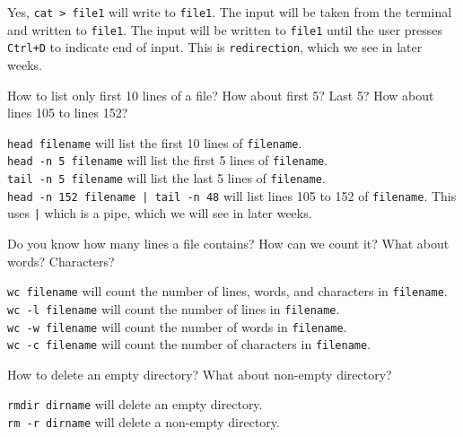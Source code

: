 \begin{ans}
  Yes, \texttt{cat > file1} will write to \texttt{file1}. The input will be taken from the
  terminal and written to \texttt{file1}. The input will be written to \texttt{file1} until
  the user presses \texttt{Ctrl+D} to indicate end of input.
  This is \texttt{redirection}, which we see in later weeks.
\end{ans}

\begin{qs}
  How to list only first 10 lines of a file? How about first 5? Last 5?
  How about lines 105 to lines 152?
\end{qs}

\begin{ans}
  \texttt{head filename} will list the first 10 lines of \texttt{filename}. \\
  \texttt{head -n 5 filename} will list the first 5 lines of \texttt{filename}. \\
  \texttt{tail -n 5 filename} will list the last 5 lines of \texttt{filename}. \\
  \texttt{head -n 152 filename | tail -n 48} will list lines 105 to 152 of \texttt{filename}.
  This uses \texttt{|} which is a pipe, which we will see in later weeks.
\end{ans}

\begin{qs}
  Do you know how many lines a file contains? How can we count it?
  What about words? Characters?
\end{qs}

\begin{ans}
  \texttt{wc filename} will count the number of lines, words, and characters in \texttt{filename}. \\
  \texttt{wc -l filename} will count the number of lines in \texttt{filename}. \\
  \texttt{wc -w filename} will count the number of words in \texttt{filename}. \\
  \texttt{wc -c filename} will count the number of characters in \texttt{filename}.
\end{ans}

\begin{qs}
  How to delete an empty directory? What about non-empty directory?
\end{qs}

\begin{ans}
  \texttt{rmdir dirname} will delete an empty directory. \\
  \texttt{rm -r dirname} will delete a non-empty directory.
\end{ans}

